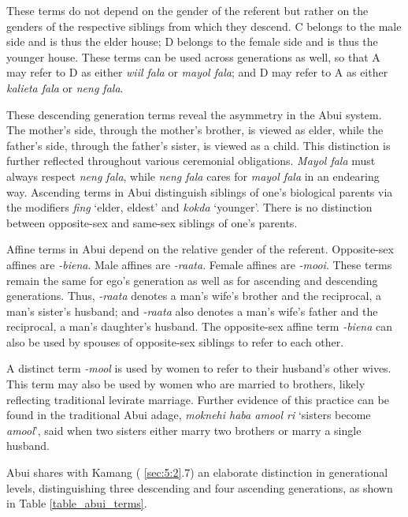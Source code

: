 These terms do not depend on the gender of the referent but rather on the genders of the respective siblings from which they descend. C belongs to the male side and is thus the elder house; D belongs to the female side and is thus the younger house. These terms can be used across generations as well, so that A may refer to D as either \textit{wiil fala} or \textit{mayol fala}; and D may refer to A as either \textit{kalieta fala} or \textit{neng fala}.

These descending generation terms reveal the asymmetry in the Abui system. The mother's side, through the mother's brother, is viewed as elder, while the father's side, through the father's sister, is viewed as a child. This distinction is further reflected throughout various ceremonial obligations. \textit{Mayol fala} must always respect \textit{neng fala}, while \textit{neng fala} cares for \textit{mayol fala} in an endearing way. Ascending terms in Abui distinguish siblings of one's biological parents via the modifiers \textit{fing} `elder, eldest' and \textit{kokda} `younger'. There is no distinction between opposite-sex and same-sex siblings of one's parents.

Affine terms in Abui depend on the relative gender of the referent. Opposite-sex affines are \textit{-biena}. Male affines are \textit{-raata}. Female affines are \textit{-mooi}. These terms remain the same for ego's generation as well as for ascending and descending generations. Thus, \textit{-raata} denotes a man's wife's brother and the reciprocal, a man's sister's husband; and \textit{-raata} also denotes a man's wife's father and the reciprocal, a man's daughter's husband. The opposite-sex affine term \textit{-biena} can also be used by spouses of opposite-sex siblings to refer to each other. 

A distinct term \textit{-mool} is used by women to refer to their husband's other wives. This term may also be used by women who are married to brothers, likely reflecting traditional levirate marriage. Further evidence of this practice can be found in the traditional Abui adage, \textit{moknehi haba amool ri} `sisters become \textit{amool}', said when two sisters either marry two brothers or marry a single husband. 

Abui shares with Kamang ({\SS} \ref{sec:5:2}.7) an elaborate distinction in generational levels, distinguishing three descending and four ascending generations, as shown in Table \ref{table_abui_terms}.

